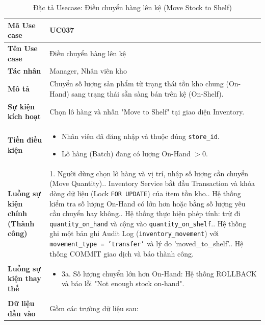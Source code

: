 \documentclass[12pt,a4paper]{report}
\begin{document}
\begin{longtable}{|>{\raggedright\arraybackslash\bfseries}p{4.5cm}|p{11cm}|}
\caption{Đặc tả Usecase: Điều chuyển hàng lên kệ (Move Stock to Shelf)} \label{tab:uc_037} \\
\hline
Mã Use case & UC037 \\ \hline
Tên Use case & Điều chuyển hàng lên kệ \\ \hline
Tác nhân & Manager, Nhân viên kho \\ \hline
Mô tả & Chuyển số lượng sản phẩm từ trạng thái tồn kho chung (On-Hand) sang trạng thái sẵn sàng bán trên kệ (On-Shelf). \\ \hline
Sự kiện kích hoạt & Chọn lô hàng và nhấn "Move to Shelf" tại giao diện Inventory. \\ \hline
Tiền điều kiện & 
\begin{itemize}[leftmargin=*, nosep, topsep=0pt, partopsep=0pt]
    \item Nhân viên đã đăng nhập và thuộc đúng \texttt{store\_id}.
    \item Lô hàng (Batch) đang có lượng On-Hand $> 0$.
\end{itemize} \\ \hline
Luồng sự kiện chính (Thành công) & 
1. Người dùng chọn lô hàng và vị trí, nhập số lượng cần chuyển (Move Quantity).\newline
2. Inventory Service bắt đầu Transaction và khóa dòng dữ liệu (Lock \texttt{FOR UPDATE}) của item tồn kho.\newline
3. Hệ thống kiểm tra số lượng On-Hand có lớn hơn hoặc bằng số lượng yêu cầu chuyển hay không.\newline
4. Hệ thống thực hiện phép tính: trừ đi \texttt{quantity\_on\_hand} và cộng vào \texttt{quantity\_on\_shelf}.\newline
5. Hệ thống ghi một bản ghi Audit Log (\texttt{inventory\_movement}) với \texttt{movement\_type = 'transfer'} và lý do 'moved\_to\_shelf'.\newline
6. Hệ thống COMMIT giao dịch và báo thành công. \\ \hline
Luồng sự kiện thay thế & 
\begin{itemize}[leftmargin=*, nosep, topsep=0pt, partopsep=0pt]
    \item 3a. Số lượng chuyển lớn hơn On-Hand: Hệ thống ROLLBACK và báo lỗi "Not enough stock on-hand".
\end{itemize} \\ \hline
Dữ liệu đầu vào & 
Gồm các trường dữ liệu sau:\newline

\end{longtable}
\end{document}
